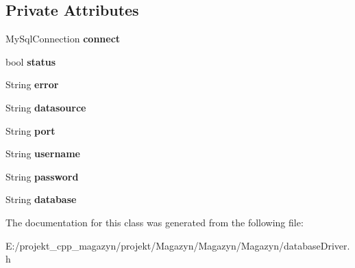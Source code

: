 \subsection*{Private Attributes}
\begin{DoxyCompactItemize}
\item 
\hypertarget{classdb_driver_space_1_1db_driver_a791089a7a18aa1992a7edc96758105ea}{}\label{classdb_driver_space_1_1db_driver_a791089a7a18aa1992a7edc96758105ea} 
My\+Sql\+Connection {\bfseries connect}
\item 
\hypertarget{classdb_driver_space_1_1db_driver_a3e98d796450119a6ec294159d45b5054}{}\label{classdb_driver_space_1_1db_driver_a3e98d796450119a6ec294159d45b5054} 
bool {\bfseries status}
\item 
\hypertarget{classdb_driver_space_1_1db_driver_a88fe0898d55c8c4b629b099687a67709}{}\label{classdb_driver_space_1_1db_driver_a88fe0898d55c8c4b629b099687a67709} 
String {\bfseries error}
\item 
\hypertarget{classdb_driver_space_1_1db_driver_a8ebd44c4291bd23df3e81c322e9d9d24}{}\label{classdb_driver_space_1_1db_driver_a8ebd44c4291bd23df3e81c322e9d9d24} 
String {\bfseries datasource}
\item 
\hypertarget{classdb_driver_space_1_1db_driver_a36f4674116485c54bcff7ef5ea7532da}{}\label{classdb_driver_space_1_1db_driver_a36f4674116485c54bcff7ef5ea7532da} 
String {\bfseries port}
\item 
\hypertarget{classdb_driver_space_1_1db_driver_a14ad4269edc3b3c24d8397681b0e01ba}{}\label{classdb_driver_space_1_1db_driver_a14ad4269edc3b3c24d8397681b0e01ba} 
String {\bfseries username}
\item 
\hypertarget{classdb_driver_space_1_1db_driver_a193fc0b5ef52446b1b2712bb10745a97}{}\label{classdb_driver_space_1_1db_driver_a193fc0b5ef52446b1b2712bb10745a97} 
String {\bfseries password}
\item 
\hypertarget{classdb_driver_space_1_1db_driver_aa7c752b216a76026a99b8bc871a17c84}{}\label{classdb_driver_space_1_1db_driver_aa7c752b216a76026a99b8bc871a17c84} 
String {\bfseries database}
\end{DoxyCompactItemize}


The documentation for this class was generated from the following file\+:\begin{DoxyCompactItemize}
\item 
E\+:/projekt\+\_\+cpp\+\_\+magazyn/projekt/\+Magazyn/\+Magazyn/\+Magazyn/database\+Driver.\+h\end{DoxyCompactItemize}
